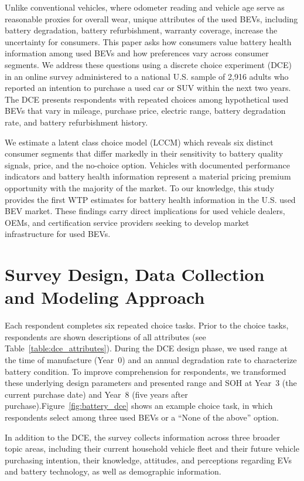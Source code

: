 \documentclass[a4paper,fleqn]{cas-sc}   %
\begin{document}
Unlike conventional vehicles, where odometer reading and vehicle age serve as reasonable proxies for overall wear, unique attributes of the used BEVs, including battery degradation, battery refurbishment, warranty coverage, increase the uncertainty for consumers. This paper asks how consumers value battery health information among used BEVs and how preferences vary across consumer segments. We address these questions using a discrete choice experiment (DCE) in an online survey administered to a national U.S. sample of 2,916 adults who reported an intention to purchase a used car or SUV within the next two years. The DCE presents respondents with repeated choices among hypothetical used BEVs that vary in mileage, purchase price, electric range, battery degradation rate, and battery refurbishment history. 

We estimate a latent class choice model (LCCM) which reveals six distinct consumer segments that differ markedly in their sensitivity to battery quality signals, price, and the no-choice option. Vehicles with documented performance indicators and battery health information represent a material pricing premium opportunity with the majority of the market. To our knowledge, this study provides the first WTP estimates for battery health information in the U.S. used BEV market. These findings carry direct implications for used vehicle dealers, OEMs, and certification service providers seeking to develop market infrastructure for used BEVs.

\section{Survey Design, Data Collection and Modeling Approach}

Each respondent completes six repeated choice tasks. Prior to the choice tasks, respondents are shown descriptions of all attributes (see Table~\ref{table:dce_attributes}). During the DCE design phase, we used range at the time of manufacture (Year~0) and an annual degradation rate to characterize battery condition. To improve comprehension for respondents, we transformed these underlying design parameters and presented range and SOH at Year~3 (the current purchase date) and Year~8 (five years after purchase).Figure~\ref{fig:battery_dce} shows an example choice task, in which respondents select among three used BEVs or a ``None of the above'' option. 

In addition to the DCE, the survey collects information across three broader topic areas, including their current household vehicle fleet and their future vehicle purchasing intention, their knowledge, attitudes, and perceptions regarding EVs and battery technology, as well as demographic information.
\end{document}
